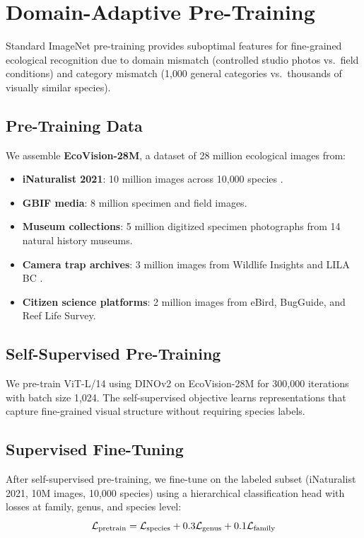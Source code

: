 \section{Domain-Adaptive Pre-Training}

\label{sec:pretraining}

Standard ImageNet pre-training provides suboptimal features for
fine-grained ecological recognition due to domain mismatch (controlled
studio photos vs.\ field conditions) and category mismatch (1{,}000
general categories vs.\ thousands of visually similar species).

\subsection{Pre-Training Data}

We assemble \textbf{EcoVision-28M}, a dataset of 28 million ecological
images from:

\begin{itemize}
  \item \textbf{iNaturalist 2021}: 10 million images across 10{,}000
    species \citep{van2021benchmarking}.
  \item \textbf{GBIF media}: 8 million specimen and field images.
  \item \textbf{Museum collections}: 5 million digitized specimen
    photographs from 14 natural history museums.
  \item \textbf{Camera trap archives}: 3 million images from Wildlife
    Insights and LILA BC \citep{beery2021iwildcam}.
  \item \textbf{Citizen science platforms}: 2 million images from
    eBird, BugGuide, and Reef Life Survey.
\end{itemize}

\subsection{Self-Supervised Pre-Training}

We pre-train ViT-L/14 using DINOv2 \citep{oquab2024dinov2} on
EcoVision-28M for 300{,}000 iterations with batch size 1{,}024. The
self-supervised objective learns representations that capture
fine-grained visual structure without requiring species labels.

\subsection{Supervised Fine-Tuning}

After self-supervised pre-training, we fine-tune on the labeled subset
(iNaturalist 2021, 10M images, 10{,}000 species) using a hierarchical
classification head with losses at family, genus, and species level:
\begin{equation}
  \mathcal{L}_{\text{pretrain}} = \mathcal{L}_{\text{species}} + 0.3
  \mathcal{L}_{\text{genus}} + 0.1 \mathcal{L}_{\text{family}}
\end{equation}


